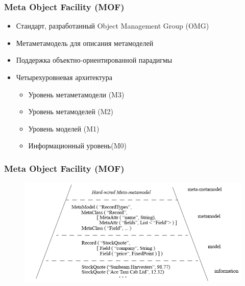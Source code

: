\documentclass{beamer}
\begin{document}
\begin{frame}
\frametitle{Meta Object Facility (MOF)}

\begin{itemize}
    \item Стандарт, разработанный Object Management Group (OMG)
    \item Метаметамодель для описания метамоделей
    \item Поддержка объектно-ориентированной парадигмы
    \item Четырехуровневая архитектура
    \begin{itemize}
        \item Уровень метаметамодели (M3)
        \item Уровень метамоделей (M2)
        \item Уровень моделей (M1)
        \item Информационный уровень(M0)
    \end{itemize}
\end{itemize}

\end{frame}
\begin{frame}
\frametitle{Meta Object Facility (MOF)}

\begin{figure}[h!]
    \begin{center}
        \includegraphics[width=\textwidth]{img/metadata_architecture}
    \end{center}
\end{figure}

\end{frame}
\end{document}

